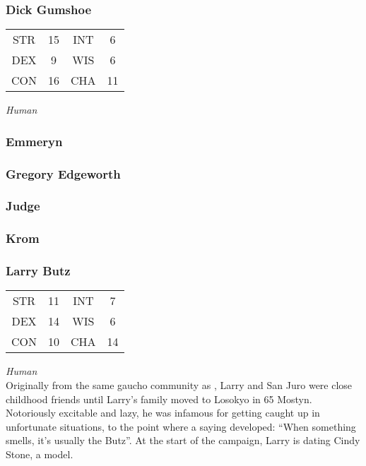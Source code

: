 \subsubsection{Dick Gumshoe}
\label{people:gumshoe}
\begin{center}
\begin{tabular}{c c|c c}
STR & 15 & INT & 6\\
DEX & 9 & WIS & 6 \\
CON & 16 & CHA & 11 \end{tabular}\end{center}
\textit{Human}\\

\subsubsection{Emmeryn}
\label{people:emmeryn}


\subsubsection{Gregory Edgeworth}
\label{people:gregory}

\subsubsection{Judge}
\label{people:judge}


\subsubsection{Krom}
\label{people:chrom}



\subsubsection{Larry Butz}
\label{people:larry}
\begin{center}
\begin{tabular}{c c|c c}
STR & 11 & INT & 7\\
DEX & 14 & WIS & 6 \\
CON & 10 & CHA & 14 \end{tabular}\end{center}
\textit{Human}\\
Originally from the same gaucho community as , Larry and San Juro were close childhood friends until Larry's family moved to Losokyo in 65 Mostyn. Notoriously excitable and lazy, he was infamous for getting caught up in unfortunate situations, to the point where a saying developed: ``When something smells, it's usually the Butz''. At the start of the campaign, Larry is dating Cindy Stone, a model.

